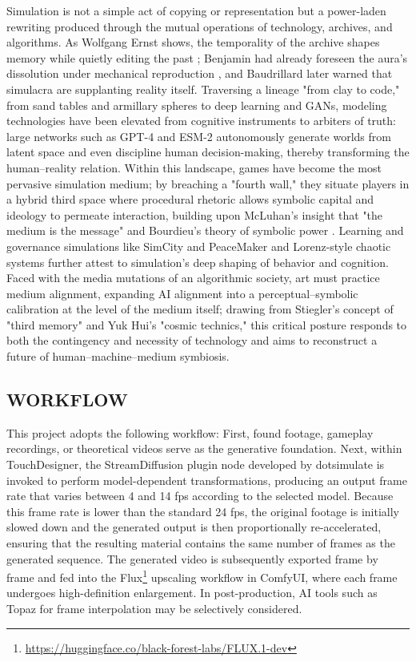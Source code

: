 \documentclass[sigconf]{acmart} %
\begin{document}
Simulation is not a simple act of copying or representation but a power-laden rewriting produced through the mutual operations of technology, archives, and algorithms. As Wolfgang Ernst shows, the temporality of the archive shapes memory while quietly editing the past \cite{Ernst_Archive}; Benjamin had already foreseen the aura's dissolution under mechanical reproduction \cite{Benjamin_WorkOfArt}, and Baudrillard later warned that simulacra are supplanting reality itself. Traversing a lineage "from clay to code," from sand tables and armillary spheres to deep learning and GANs, modeling technologies have been elevated from cognitive instruments to arbiters of truth: large networks such as GPT-4 and ESM-2 autonomously generate worlds from latent space and even discipline human decision-making, thereby transforming the human–reality relation. Within this landscape, games have become the most pervasive simulation medium; by breaching a "fourth wall," they situate players in a hybrid third space where procedural rhetoric allows symbolic capital and ideology to permeate interaction, building upon McLuhan's insight that "the medium is the message" \cite{McLuhan_UnderstandingMedia} and Bourdieu's theory of symbolic power \cite{Bourdieu_SymbolicPower}. Learning and governance simulations like SimCity and PeaceMaker and Lorenz-style chaotic systems further attest to simulation's deep shaping of behavior and cognition. Faced with the media mutations of an algorithmic society, art must practice medium alignment, expanding AI alignment into a perceptual–symbolic calibration at the level of the medium itself; drawing from Stiegler's concept of "third memory" \cite{Stiegler_TechnicsTime1} and Yuk Hui's "cosmic technics," \cite{Hui_Cosmotechnics} this critical posture responds to both the contingency and necessity of technology and aims to reconstruct a future of human–machine–medium symbiosis.



\subsection{WORKFLOW}
This project adopts the following workflow: First, found footage, gameplay recordings, or theoretical videos serve as the generative foundation. Next, within TouchDesigner, the StreamDiffusion plugin node developed by dotsimulate is invoked to perform model-dependent transformations, producing an output frame rate that varies between 4 and 14 fps according to the selected model. Because this frame rate is lower than the standard 24 fps, the original footage is initially slowed down and the generated output is then proportionally re-accelerated, ensuring that the resulting material contains the same number of frames as the generated sequence. The generated video is subsequently exported frame by frame and fed into the Flux\footnote{\url{https://huggingface.co/black-forest-labs/FLUX.1-dev}} upscaling workflow in ComfyUI, where each frame undergoes high-definition enlargement. In post-production, AI tools such as Topaz for frame interpolation may be selectively considered.
\end{document}
